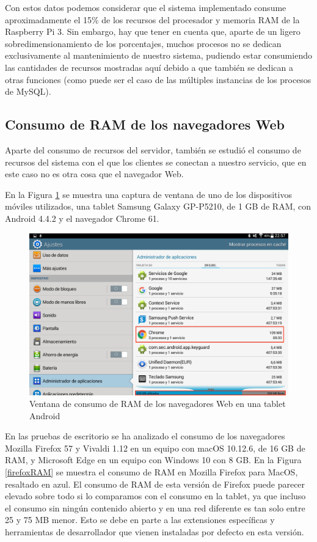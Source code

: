 Con estos datos podemos considerar que el sistema implementado consume aproximadamente el 15\% de los recursos del procesador y memoria RAM de la Raspberry Pi 3. Sin embargo, hay que tener en cuenta que, aparte de un ligero sobredimensionamiento de los porcentajes, muchos procesos no se dedican exclusivamente al mantenimiento de nuestro sistema, pudiendo estar consumiendo las cantidades de recursos mostradas aquí debido a que también se dedican a otras funciones (como puede ser el caso de las múltiples instancias de los procesos de MySQL).


\subsection{Consumo de RAM de los navegadores Web}

Aparte del consumo de recursos del servidor, también se estudió el consumo de recursos del sistema con el que los clientes se conectan a nuestro servicio, que en este caso no es otra cosa que el navegador Web.

En la Figura \ref{tabletChrome} se muestra una captura de ventana de uno de los dispositivos móviles utilizados, una tablet Samsung Galaxy GP-P5210, de 1 GB de RAM, con Android 4.4.2 y el navegador Chrome 61.

\begin{figure}[!t]
\begin{center}
\includegraphics[width=0.75\linewidth]{./6_EvalEmpirica/Img/tabletChrome.png}
\end{center}
\caption{Ventana de consumo de RAM de los navegadores Web en una tablet Android}
\label{tabletChrome}
\end{figure}

En las pruebas de escritorio se ha analizado el consumo de los navegadores Mozilla Firefox 57 y Vivaldi 1.12 en un equipo con macOS 10.12.6, de 16 GB de RAM, y Microsoft Edge en un equipo con Windows 10 con 8 GB. En la Figura \ref{firefoxRAM} se muestra el consumo de RAM en Mozilla Firefox para MacOS, resaltado en azul. El consumo de RAM de esta versión de Firefox puede parecer elevado sobre todo si lo comparamos con el consumo en la tablet, ya que incluso el consumo sin ningún contenido abierto y en una red diferente es tan solo entre 25 y 75 MB menor. Esto se debe en parte a las extensiones específicas y herramientas de desarrollador que vienen instaladas por defecto en esta versión.


